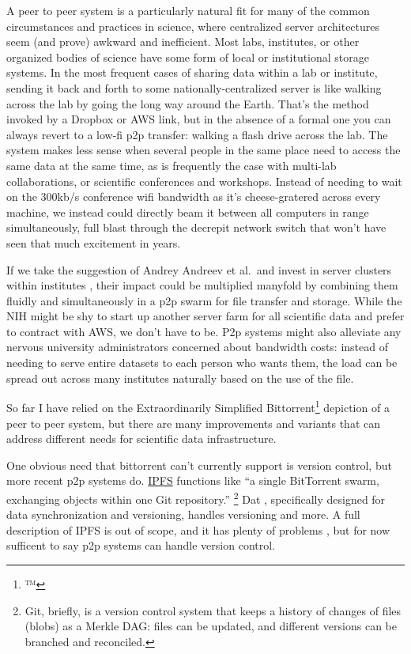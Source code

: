 \documentclass[10pt]{article}
\begin{document}
\begin{multicols}{2}
A peer to peer system is a particularly natural fit for many of the
common circumstances and practices in science, where centralized server
architectures seem (and prove) awkward and inefficient. Most labs,
institutes, or other organized bodies of science have some form of local
or institutional storage systems. In the most frequent cases of sharing
data within a lab or institute, sending it back and forth to some
nationally-centralized server is like walking across the lab by going
the long way around the Earth. That's the method invoked by a Dropbox or
AWS link, but in the absence of a formal one you can always revert to a
low-fi p2p transfer: walking a flash drive across the lab. The system
makes less sense when several people in the same place need to access
the same data at the same time, as is frequently the case with multi-lab
collaborations, or scientific conferences and workshops. Instead of
needing to wait on the 300kb/s conference wifi bandwidth as it's
cheese-gratered across every machine, we instead could directly beam it
between all computers in range simultaneously, full blast through the
decrepit network switch that won't have seen that much excitement in
years.

If we take the suggestion of Andrey Andreev et al.~and invest in server
clusters within institutes \cite{andreevBiologistsNeedModern2021, charlesCommunityDrivenBigOpen2020} , their impact could be multiplied
manyfold by combining them fluidly and simultaneously in a p2p swarm for
file transfer and storage. While the NIH might be shy to start up
another server farm for all scientific data and prefer to contract with
AWS, we don't have to be. P2p systems might also alleviate any nervous
university administrators concerned about bandwidth costs: instead of
needing to serve entire datasets to each person who wants them, the load
can be spread out across many institutes naturally based on the use of
the file.

So far I have relied on the Extraordinarily Simplified
Bittorrent\footnote{™️} depiction of a peer to peer system, but there
are many improvements and variants that can address different needs for
scientific data infrastructure.

One obvious need that bittorrent can't currently support is version
control, but more recent p2p systems do. \href{https://ipfs.io/}{IPFS}
functions like ``a single BitTorrent swarm, exchanging objects within
one Git repository.'' \cite{benetIPFSContentAddressed2014} \footnote{Git, briefly, is a version control system that keeps a
  history of changes of files (blobs) as a Merkle DAG: files can be
  updated, and different versions can be branched and reconciled.} Dat
\cite{ogdenDatDistributedDataset2017} , specifically designed for
data synchronization and versioning, handles versioning and more. A full
description of IPFS is out of scope, and it has plenty of problems \cite{patsakisHydrasIPFSDecentralised2019} , but for now sufficent to
say p2p systems can handle version control.


\end{multicols}
\end{document}
